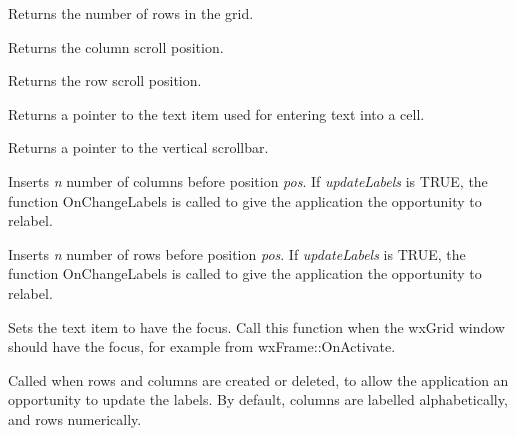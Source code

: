
Returns the number of rows in the grid.



Returns the column scroll position.



Returns the row scroll position.



Returns a pointer to the text item used for entering text into a cell.



Returns a pointer to the vertical scrollbar.



Inserts {\it n} number of columns before position {\it pos}. If {\it updateLabels} is TRUE,
the function OnChangeLabels is called to give the application the opportunity to relabel.



Inserts {\it n} number of rows before position {\it pos}. If {\it updateLabels} is TRUE,
the function OnChangeLabels is called to give the application the opportunity to relabel.



Sets the text item to have the focus. Call this function when the wxGrid window should have the
focus, for example from wxFrame::OnActivate.



Called when rows and columns are created or deleted, to allow the application an
opportunity to update the labels. By default, columns are labelled alphabetically,
and rows numerically.

